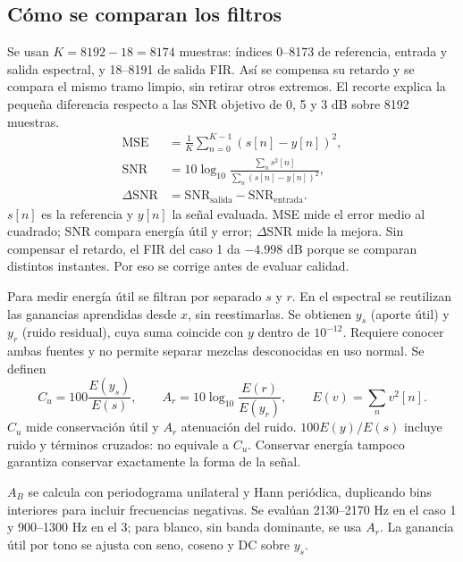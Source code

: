 \documentclass[11pt,a4paper]{article}
\begin{document}
\subsection{Cómo se comparan los filtros}
Se usan $K=8192-18=8174$ muestras: índices 0--8173 de referencia, entrada y salida espectral, y 18--8191 de salida FIR. Así se compensa su retardo y se compara el mismo tramo limpio, sin retirar otros extremos. El recorte explica la pequeña diferencia respecto a las SNR objetivo de 0, 5 y 3 dB sobre 8192 muestras.
\begin{align}
\mathrm{MSE}&=\frac1K\sum_{n=0}^{K-1}(s[n]-y[n])^2,\\
\mathrm{SNR}&=10\log_{10}\frac{\sum_n s^2[n]}{\sum_n(s[n]-y[n])^2},\\
\Delta\mathrm{SNR}&=\mathrm{SNR}_{\mathrm{salida}}-\mathrm{SNR}_{\mathrm{entrada}}.
\end{align}
$s[n]$ es la referencia y $y[n]$ la señal evaluada. MSE mide el error medio al cuadrado; SNR compara energía útil y error; $\Delta$SNR mide la mejora. Sin compensar el retardo, el FIR del caso 1 da $-4.998$ dB porque se comparan distintos instantes. Por eso se corrige antes de evaluar calidad.

Para medir energía útil se filtran por separado $s$ y $r$. En el espectral se reutilizan las ganancias aprendidas desde $x$, sin reestimarlas. Se obtienen $y_s$ (aporte útil) y $y_r$ (ruido residual), cuya suma coincide con $y$ dentro de $10^{-12}$. Requiere conocer ambas fuentes y no permite separar mezclas desconocidas en uso normal. Se definen
\begin{equation}
C_u=100\frac{E(y_s)}{E(s)},\qquad A_r=10\log_{10}\frac{E(r)}{E(y_r)},\qquad E(v)=\sum_n v^2[n].
\end{equation}
$C_u$ mide conservación útil y $A_r$ atenuación del ruido. $100E(y)/E(s)$ incluye ruido y términos cruzados: no equivale a $C_u$. Conservar energía tampoco garantiza conservar exactamente la forma de la señal.

$A_B$ se calcula con periodograma unilateral y Hann periódica, duplicando bins interiores para incluir frecuencias negativas. Se evalúan 2130--2170 Hz en el caso 1 y 900--1300 Hz en el 3; para blanco, sin banda dominante, se usa $A_r$. La ganancia útil por tono se ajusta con seno, coseno y DC sobre $y_s$.

\begin{table}[H]\centering\small\caption{Calidad en el mismo intervalo: salidas con el retardo compensado, $K=8174$.}\label{tab:calidad}\end{table}
\begin{table}[H]\centering\small\caption{Energía útil conservada, energía total de salida y atenuación del ruido. $A_B$ no aplica al caso blanco.}\end{table}
\begin{table}[H]\centering\small\caption{Ganancia de cada tono útil usando las ganancias calculadas desde la mezcla.}\end{table}
\end{document}
